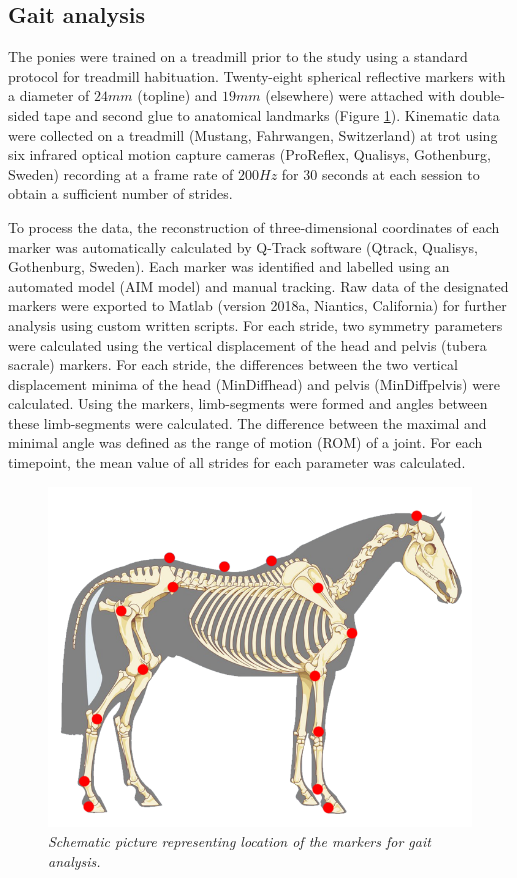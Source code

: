 \documentclass[twocolumn, serif, empirical, authordate, seplic]{jote-article}
\begin{document}
 {}\subsection*{Gait analysis} 

The ponies were trained on a treadmill prior to the study using a standard protocol for treadmill habituation. Twenty-eight spherical reflective markers with a diameter of $24 mm$ (topline) and $19 mm$ (elsewhere) were attached with double-sided tape and second glue to anatomical landmarks (Figure \ref{fig:figure3}). Kinematic data were collected on a treadmill (Mustang, Fahrwangen, Switzerland) at trot using six infrared optical motion capture cameras (ProReflex, Qualisys, Gothenburg, Sweden) recording at a frame rate of $200 Hz$ for $30$ seconds at each session to obtain a sufficient number of strides.

To process the data, the reconstruction of three-dimensional coordinates of each marker was automatically calculated by Q-Track software (Qtrack, Qualisys, Gothenburg, Sweden). Each marker was identified and labelled using an automated model (AIM model) and manual tracking. Raw data of the designated markers were exported to Matlab (version 2018a, Niantics, California) for further analysis using custom written scripts. For each stride, two symmetry parameters were calculated using the vertical displacement of the head and pelvis (tubera sacrale) markers. For each stride, the differences between the two vertical displacement minima of the head (MinDiffhead) and pelvis (MinDiffpelvis) were calculated. Using the markers, limb-segments were formed and angles between these limb-segments were calculated. The difference between the maximal and minimal angle was defined as the range of motion (ROM) of a joint. For each timepoint, the mean value of all strides for each parameter was calculated.



\begin{figure}
\centering \includegraphics[width=\columnwidth]{articles/empirical/horse/media/image3.png}
\caption{\emph{Schematic picture representing location of the markers for gait analysis.}}
\label{fig:figure3}\end{figure}
\end{document}
